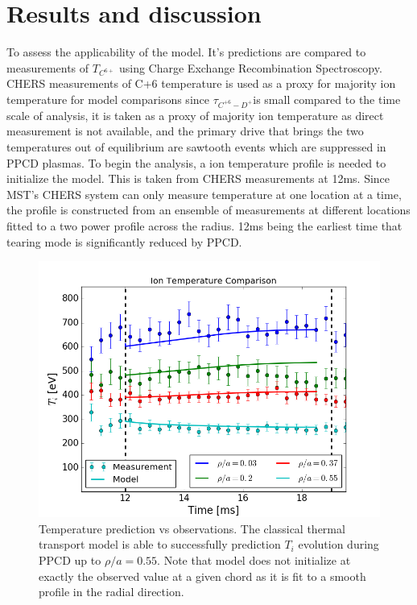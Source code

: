 \documentclass[aip, pop, preprint]{revtex4-1}
\begin{document}
\section{Results and discussion}

To assess the applicability of the model. It's predictions are compared to measurements of $T_{C^{6+}}$ using Charge Exchange Recombination Spectroscopy\cite{DenHartog1994ADynamics,DenHartog1994ADynamics}. CHERS measurements of C+6 temperature is used as a proxy for majority ion temperature for model comparisons since $\tau_{C^{+6}-D^{+}}$is small compared to the time scale of analysis, it is taken as a proxy of majority ion temperature as direct measurement is not available\cite{Reardon03}, and the primary drive that brings the two temperatures out of equilibrium are sawtooth events which are suppressed in PPCD plasmas\cite{Fiksel2009Mass-dependentPlasma}. To begin the analysis, a ion temperature profile is needed to initialize the model. This is taken from CHERS measurements at 12ms. Since MST's CHERS system can only measure temperature at one location at a time, the profile is constructed from an ensemble of measurements at different locations fitted to a two power profile across the radius. 12ms being the earliest time that tearing mode is significantly reduced by PPCD. 

\begin{figure}[!h]
	\centering
	\includegraphics[width=0.95\columnwidth]{./plots/temp_comp_ext}
	\caption{Temperature prediction vs observations. The classical thermal transport model is able to successfully prediction $T_i$ evolution during PPCD up to $\rho /a = 0.55$. Note that model does not initialize at exactly the observed value at a given chord as it is fit to a smooth profile in the radial direction.\label{fig:comp}}
\end{figure}
\end{document}
